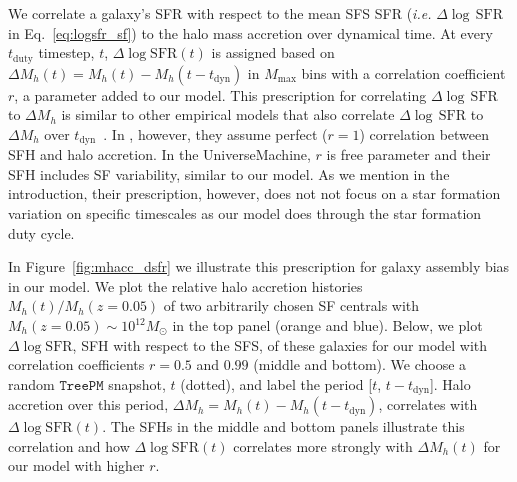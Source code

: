 \documentclass[12pt, letterpaper, preprint, tighten]{aastex62}
\newcommand{\logsfr}{\log\mathrm{SFR}}
\begin{document}
We correlate a galaxy's SFR with respect to the mean SFS SFR 
(\emph{i.e.} $\Delta\log\,\mathrm{SFR}$ in Eq.~\ref{eq:logsfr_sf}) to the 
halo mass accretion over dynamical time. At every $t_\mathrm{duty}$ timestep, 
$t$, $\Delta\logsfr(t)$ is assigned based on 
$\Delta M_h(t) = M_h(t) - M_h(t - t_\mathrm{dyn})$ in $M_\mathrm{max}$ bins 
with a correlation coefficient $r$, a parameter added to our model. This 
prescription for correlating $\Delta\log\,\mathrm{SFR}$ to $\Delta M_h$ is 
similar to other empirical models that also correlate $\Delta\log\,\mathrm{SFR}$ 
to $\Delta M_h$ over $t_\mathrm{dyn}$~\citep{rodriguez-puebla2016a, behroozi2018}.
In \cite{rodriguez-puebla2016a}, however, they assume perfect ($r=1$) correlation 
between SFH and halo accretion. In the \cite{behroozi2018} {\sc UniverseMachine}, 
$r$ is free parameter and their SFH includes SF variability, similar to our model. 
As we mention in the introduction, their prescription, however, does not not focus 
on a star formation variation on specific timescales as our model does through 
the star formation duty cycle. 

In Figure~\ref{fig:mhacc_dsfr} we illustrate this prescription for galaxy
assembly bias in our model. We plot the relative halo accretion histories 
$M_h(t)/M_h(z{=}0.05)$ of two arbitrarily chosen SF centrals with 
$M_h(z{=}0.05)\sim10^{12}M_\odot$ in the top panel (orange and blue). Below, we plot 
$\Delta\logsfr$, SFH with respect to the SFS, of these galaxies for our model with 
correlation coefficients $r=0.5$ and $0.99$ (middle and bottom). We choose a
random $\mathtt{TreePM}$ snapshot, $t$ (dotted), and label the period 
[$t$, $t - t_\mathrm{dyn}$]. Halo accretion over this period, 
$\Delta M_h = M_h(t) - M_h(t-t_\mathrm{dyn})$, correlates with $\Delta\logsfr(t)$. 
The SFHs in the middle and bottom panels illustrate this correlation and how 
$\Delta\logsfr(t)$ correlates more strongly with $\Delta M_h(t)$ for our model 
with higher $r$. 
\end{document}
